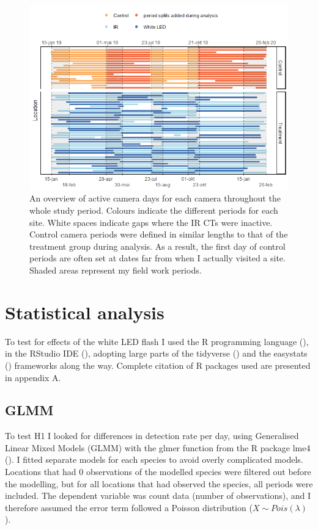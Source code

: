 \begin{figure}
		\centering
		\includegraphics[scale=.8]{../R/FLM_notebook_files/figure-gfm/effort-facet-1.png}	
\caption[An overview of active camera days]
{An overview of active camera days for each camera throughout the whole study period. %
Colours indicate the different periods for each site. White spaces indicate gaps where the IR CTs were inactive. Control camera periods were defined in similar lengths to that of the treatment group during analysis. As a result, the first day of control periods are often set at dates far from when I actually visited a site. Shaded areas represent my field work periods. \label{fig:timeseries}}
\end{figure}



\section{Statistical analysis} 

To test for effects of the white LED flash I used the R programming language (\cite{R-base}), in the RStudio IDE (\cite{RStudio}), adopting large parts of the tidyverse (\cite{tidyverse}) and the easystats (\cite{easystats}) frameworks along the way. Complete citation of R packages used are presented in appendix A. %



	\subsection*{GLMM}
To test H1 I looked for differences in detection rate per day, using Generalised Linear Mixed Models (GLMM) with the glmer function from the R package lme4 (\cite{R-lme4}).
I fitted separate models for each species to avoid overly complicated models. 
Locations that had 0 observations of the modelled species were filtered out before the modelling, but for all locations that had observed the species, all periods were included.
The dependent variable was count data (number of observations), and I therefore assumed the error term followed a Poisson distribution ($ X \sim Pois(\lambda) $).

